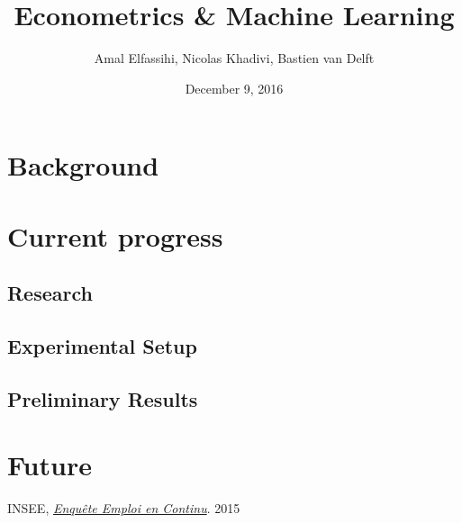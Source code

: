 \documentclass[a4paper]{article}
\begin{document}
\title{Econometrics \& Machine Learning}
\author{Amal Elfassihi, Nicolas Khadivi, Bastien van Delft}
\date{December 9, 2016}
\maketitle

\section{Background}

\section{Current progress}
\subsection{Research}
\subsection{Experimental Setup}
\subsection{Preliminary Results}

\section{Future}
\clearpage
\begin{thebibliography}{9}
        INSEE,
        \href{https://www.insee.fr/fr/statistiques/2388681}{\emph{Enqu\^ete Emploi en Continu}}.
        2015
\end{thebibliography}
\end{document}
